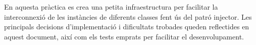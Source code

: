 
En aquesta pràctica es crea una petita infraestructura 
per facilitar la interconnexió de les instàncies de 
diferents classes fent ús del patró injector. Les 
principals decisions d'implementació i dificultats 
trobades queden reflectides en aquest document, així
com els tests emprats per facilitar el desenvolupament. 







